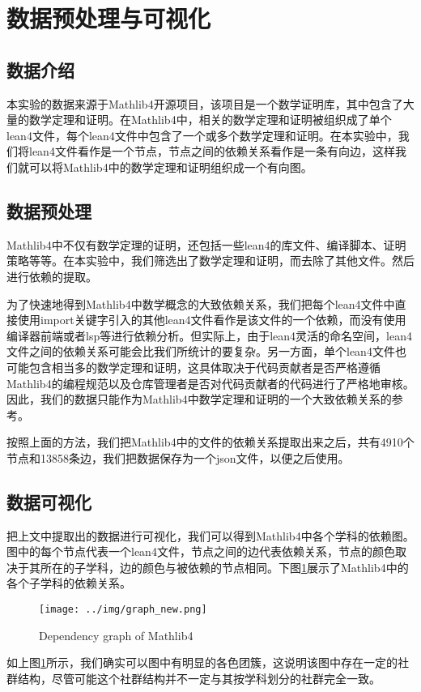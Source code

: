 \section{数据预处理与可视化}

\subsection{数据介绍}

本实验的数据来源于Mathlib4开源项目\cite{mathlib4}，该项目是一个数学证明库，其中包含了大量的数学定理和证明。在Mathlib4中，相关的数学定理和证明被组织成了单个lean4文件，每个lean4文件中包含了一个或多个数学定理和证明。在本实验中，我们将lean4文件看作是一个节点，节点之间的依赖关系看作是一条有向边，这样我们就可以将Mathlib4中的数学定理和证明组织成一个有向图。

\subsection{数据预处理}

Mathlib4中不仅有数学定理的证明，还包括一些lean4的库文件、编译脚本、证明策略等等。在本实验中，我们筛选出了数学定理和证明，而去除了其他文件。然后进行依赖的提取。

为了快速地得到Mathlib4中数学概念的大致依赖关系，我们把每个lean4文件中直接使用import关键字引入的其他lean4文件看作是该文件的一个依赖，而没有使用编译器前端或者lsp等进行依赖分析。但实际上，由于lean4灵活的命名空间，lean4文件之间的依赖关系可能会比我们所统计的要复杂。另一方面，单个lean4文件也可能包含相当多的数学定理和证明，这具体取决于代码贡献者是否严格遵循Mathlib4的编程规范以及仓库管理者是否对代码贡献者的代码进行了严格地审核。因此，我们的数据只能作为Mathlib4中数学定理和证明的一个大致依赖关系的参考。

按照上面的方法，我们把Mathlib4中的文件的依赖关系提取出来之后，共有4910个节点和13858条边，我们把数据保存为一个json文件，以便之后使用。

\subsection{数据可视化}

把上文中提取出的数据进行可视化，我们可以得到Mathlib4中各个学科的依赖图。图中的每个节点代表一个lean4文件，节点之间的边代表依赖关系，节点的颜色取决于其所在的子学科，边的颜色与被依赖的节点相同。下图\ref{fig:dependency}展示了Mathlib4中的各个子学科的依赖关系。

\begin{figure}[H]
    \centering
    \texttt{[image: ../img/graph\_new.png]}
    \caption{Dependency graph of Mathlib4}
    \label{fig:dependency}
\end{figure}

如上图\ref{fig:dependency}所示，我们确实可以图中有明显的各色团簇，这说明该图中存在一定的社群结构，尽管可能这个社群结构并不一定与其按学科划分的社群完全一致。

